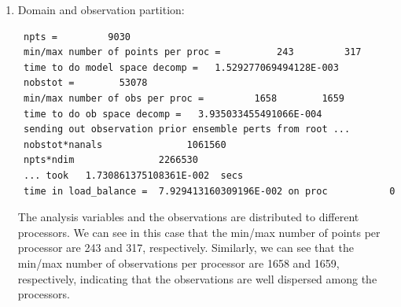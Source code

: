 \begin{enumerate}
\begin{footnotesize}
\begin{verbatim}
       hirs4_metop-a   6     7 -0.748E+00  0.782E+00  0.473E+00  0.109E+00  0.460E+00
       hirs4_metop-a   7     9 -0.557E+00  0.815E+00  0.580E+00  0.108E+00  0.570E+00
       hirs4_metop-a   8     9  0.374E+00  0.675E+00  0.100E+01  0.208E-01  0.100E+01
       hirs4_metop-a  10     9  0.199E+00  0.581E+00  0.612E+00  0.120E+00  0.600E+00
       hirs4_metop-a  11     9 -0.380E-01  0.718E+00  0.143E+01  0.770E+00  0.120E+01
       hirs4_metop-a  12    34 -0.988E+00  0.179E+01  0.213E+01  0.141E+01  0.160E+01
       hirs4_metop-a  13     9  0.694E-01  0.330E+00  0.382E+00  0.116E+00  0.364E+00
       hirs4_metop-a  14     9 -0.369E-01  0.257E+00  0.294E+00  0.137E+00  0.260E+00
       hirs4_metop-a  15     9  0.352E-01  0.289E+00  0.281E+00  0.107E+00  0.260E+00
\end{verbatim}
\end{footnotesize}

This table should be checked in order to determine if the inflation is appropriate. The goal is to make the total ensemble spreads of priors ($\sqrt{S+R}$ match the innovations (innov std) as much as possible. We can see in certain regions, particularly in the NH the differences are noteable. These differences are associated with higher observation error ($\sqrt{R}$). Users should consider tuning of inflation and localization, which is typically determined using cases with multiple assimilation cycles. Refer to section 4.2 of this User\textquotesingle s Guide for more information on tuning.\\

\item Domain and observation partition:

\begin{footnotesize}
\begin{verbatim}
 npts =         9030
 min/max number of points per proc =          243         317
 time to do model space decomp =   1.529277069494128E-003
 nobstot =        53078
 min/max number of obs per proc =         1658        1659
 time to do ob space decomp =   3.935033455491066E-004
 sending out observation prior ensemble perts from root ...
 nobstot*nanals               1061560
 npts*ndim               2266530
 ... took   1.730861375108361E-002  secs
 time in load_balance =  7.929413160309196E-002 on proc           0
\end{verbatim}
\end{footnotesize}


The analysis variables and the observations are distributed to different processors. We can see in this case that the min/max number of points per processor are 243 and 317, respectively. Similarly, we can see that the min/max number of observations per processor are 1658 and 1659, respectively, indicating that the observations are well dispersed among the processors.


\end{enumerate}
